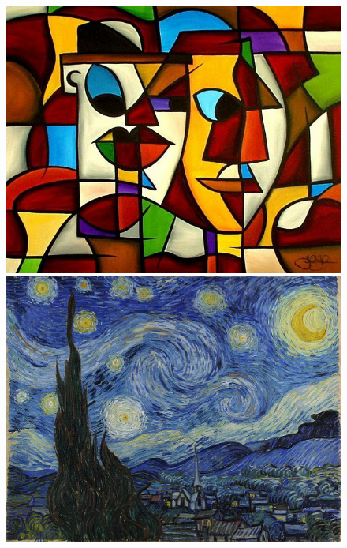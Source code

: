 \documentclass[17pt]{extarticle}
\begin{document}
\begin{figure}
\begin{minipage}{.5\textwidth}
    	\includegraphics[scale=0.5]{happycubism.jpg}

    	\includegraphics[scale=0.29]{starrynight.jpg}
    		

\end{minipage}
\end{figure}
\end{document}
